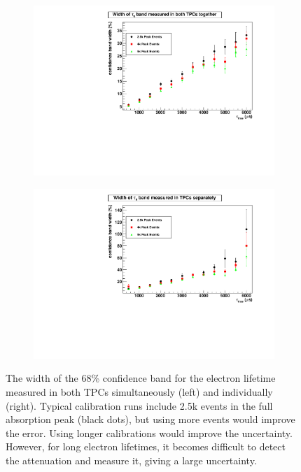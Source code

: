 \documentclass[herrin-thesis.tex]{subfiles}
\begin{document}
\begin{figure}[htb]
\begin{subfigure}[b]{0.5\linewidth}
\centering
\includegraphics[width=1.0\columnwidth]{./plots/el_sim_width_both.pdf}
\end{subfigure}%
\begin{subfigure}[b]{0.5\linewidth}
\centering
\includegraphics[width=1.0\columnwidth]{./plots/el_sim_width_indiv.pdf}
\end{subfigure}
\caption[Confidence band widths for electron lifetime measurements]{The width of the 68\% confidence band for the electron lifetime measured in both TPCs simultaneously (left) and individually (right). Typical calibration runs include 2.5k events in the full absorption peak (black dots), but using more events would improve the error. Using longer calibrations would improve the uncertainty. However, for long electron lifetimes, it becomes difficult to detect the attenuation and measure it, giving a large uncertainty.}
\label{fig:el_sim_width}
\end{figure}
\end{document}
